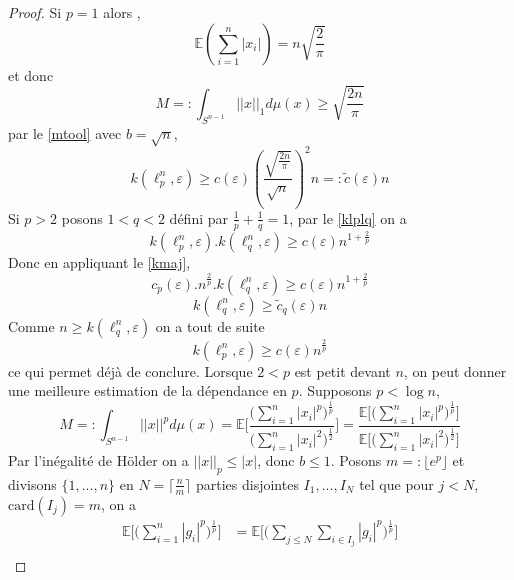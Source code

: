 \documentclass[12pt]{article}
\theoremstyle{definition}
\begin{document}
\begin{proof}
	Si $p=1$ alors , 
	\begin{equation*}
	\mathbb{E}\left(\sum_{i=1}^{n}|x_i|\right)=n\sqrt{\frac{2}{\pi}}
	\end{equation*}
	et donc
	\begin{equation*}
		M=:\int_{S^{n-1}}||x||_1 d\mu(x)\geq \sqrt{\frac{2n}{\pi}}
	\end{equation*}
	par le \cref{mtool} avec $b=\sqrt{n}$,
	\begin{equation*}
		k(\ell_p^n,\varepsilon)\geq c(\varepsilon)\left(\frac{\sqrt{\frac{2n}{\pi}}}{\sqrt{n}}\right)^2n =:\tilde{c}(\varepsilon)n
	\end{equation*}
	Si $p>2$ posons $1<q< 2$ défini par $\frac{1}{p}+\frac{1}{q}=1$, par le \cref{klplq} on a 
	\begin{equation*}
	k(\ell_p^n,\varepsilon).k(\ell_q^n,\varepsilon)\geq c(\varepsilon) n^{1+\frac{2}{p}}
	\end{equation*}
	Donc en appliquant le \cref{kmaj},
	\begin{equation*}
	c_p(\varepsilon).n^{\frac{2}{p}}.k(\ell_q^n,\varepsilon)\geq c(\varepsilon) n^{1+\frac{2}{p}}
	\end{equation*}
	\begin{equation*}
	k(\ell_q^n,\varepsilon)\geq \tilde{c}_q(\varepsilon)n
	\end{equation*}
	Comme $n\geq k(\ell_q^n,\varepsilon)$ on a tout de suite 
	\begin{equation*}
	k(\ell_p^n,\varepsilon)\geq c(\varepsilon) n^{\frac{2}{p}}
	\end{equation*}
ce qui permet déjà de conclure. Lorsque $2<p$ est petit devant $n$, on peut donner une meilleure estimation de la dépendance en $p$. Supposons $p<\log n$,
\begin{equation*}
M =: \int_{S^{n-1}}||x||^p d\mu(x) = \mathbb{E}\Bigg[\frac{\big(\sum_{i=1}^{n}|x_i|^p\big)^{\frac{1}{p}}}{\big(\sum_{i=1}^{n}|x_i|^2\big)^{\frac{1}{2}}}\Bigg]= \frac{\mathbb{E}\Bigg[\big(\sum_{i=1}^{n}|x_i|^p\big)^{\frac{1}{p}}\Bigg]}{\mathbb{E}\Bigg[\big(\sum_{i=1}^{n}|x_i|^2\big)^{\frac{1}{2}}\Bigg]}
\end{equation*}
Par l'inégalité de Hölder on a $||x||_p\leq |x|$, donc $b\leq1$. Posons $m=:\lfloor e^p\rfloor$ et divisons $\{1,...,n\}$ en $N=\lceil\frac{n}{m}\rceil$ parties disjointes $I_1,...,I_N$ tel que pour $j<N$, $\text{card}(I_j)=m$, on a 
\begin{align*}
\mathbb{E}\Big[\Big(\sum_{i=1}^{n}|g_i|^p\Big)^{\frac{1}{p}}\Big]&= \mathbb{E}\Big[\Big(\sum_{j\leq N}\sum_{i\in I_j}|g_i|^p\Big)^{\frac{1}{p}}\Big]\\

\end{align*}
\end{proof}
\end{document}
